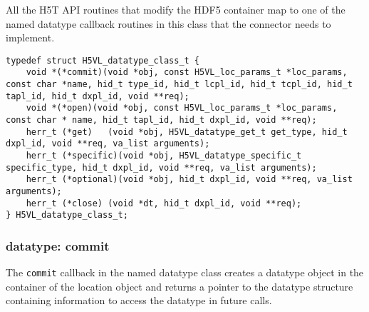 All the H5T API routines that modify the HDF5 container map to one of
the named datatype callback routines in this class that the connector needs to
implement.

\begin{lstlisting}[caption={Structure for datatype callback routines, H5VLconnector.h}, captionpos=b, label={lst:H5Tclass}]
typedef struct H5VL_datatype_class_t {                                           
    void *(*commit)(void *obj, const H5VL_loc_params_t *loc_params, const char *name, hid_t type_id, hid_t lcpl_id, hid_t tcpl_id, hid_t tapl_id, hid_t dxpl_id, void **req);
    void *(*open)(void *obj, const H5VL_loc_params_t *loc_params, const char * name, hid_t tapl_id, hid_t dxpl_id, void **req);
    herr_t (*get)   (void *obj, H5VL_datatype_get_t get_type, hid_t dxpl_id, void **req, va_list arguments);
    herr_t (*specific)(void *obj, H5VL_datatype_specific_t specific_type, hid_t dxpl_id, void **req, va_list arguments);            
    herr_t (*optional)(void *obj, hid_t dxpl_id, void **req, va_list arguments); 
    herr_t (*close) (void *dt, hid_t dxpl_id, void **req);                       
} H5VL_datatype_class_t; 
\end{lstlisting}

\subsubsection{datatype: commit}
The \texttt{commit} callback in the named datatype class creates a datatype object in the container of the location object and
returns a pointer to the datatype structure containing information to access the datatype in future calls.\bigskip

